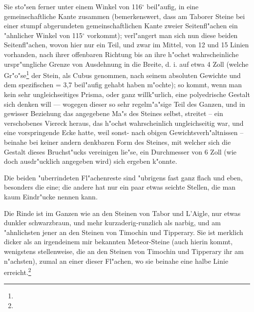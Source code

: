 \documentclass[a4paper, 11pt, oneside, german]{article}
\begin{document}
Sie sto"sen ferner unter einem Winkel von 116$^{\circ}$ beil"aufig, in eine gemeinschaftliche Kante zusammen (bemerkenswert, dass am Taborer Steine bei einer stumpf abgerundeten gemeinschaftlichen Kante zweier Seitenfl"achen ein "ahnlicher Winkel von 115$^{\circ}$ vorkommt); verl"angert man sich nun diese beiden Seitenfl"achen, wovon hier nur ein Teil, und zwar im Mittel, von 12 und 15 Linien vorhanden, nach ihrer offenbaren Richtung bis an ihre h"ochst wahrscheinliche urspr"ungliche Grenze von Ausdehnung in die Breite, d. i. auf etwa 4 Zoll (welche Gr"o"se\footnote{} der Stein, als Cubus genommen, nach seinem absoluten Gewichte und dem spezifischen = 3,7 beil"aufig gehabt haben m"ochte); so kommt, wenn man kein sehr ungleichseitiges Prisma, oder ganz willk"urlich, eine polyedrische Gestalt sich denken will --- wogegen dieser so sehr regelm"a"sige Teil des Ganzen, und in gewisser Beziehung das angegebene Ma"s des Steines selbst, streitet -- ein verschobenes Viereck heraus, das h"ochst wahrscheinlich ungleichseitig war, und eine vorspringende Ecke hatte, weil sonst- nach obigen Gewichtsverh"altnissen -- beinahe bei keiner andern denkbaren Form des Steines, mit welcher sich die Gestalt dieses Bruchst"ucks vereinigen lie"se, ein Durchmesser von 6 Zoll (wie doch ausdr"ucklich angegeben wird) sich ergeben k"onnte.

Die beiden "uberrindeten Fl"achenreste sind "ubrigens fast ganz flach und eben, besonders die eine; die andere hat nur ein paar etwas seichte Stellen, die man kaum Eindr"ucke nennen kann.

Die Rinde ist im Ganzen wie an den Steinen von Tabor und L'Aigle, nur etwas dunkler schwarzbraun, und mehr kurzaderig-runzlich als narbig, und am "ahnlichsten jener an den Steinen von Timochin und Tipperary. Sie ist merklich dicker als an irgendeinem mir bekannten Meteor-Steine (auch hierin kommt, wenigstens stellenweise, die an den Steinen von Timochin und Tipperary ihr am n"achsten), zumal an einer dieser Fl"achen, wo sie beinahe eine halbe Linie erreicht.\footnote{}
\end{document}
